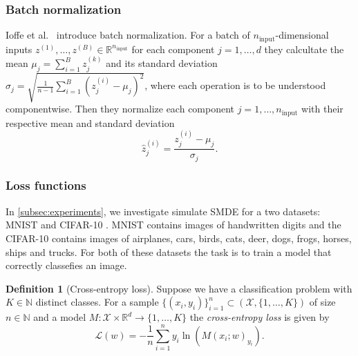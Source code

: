 \documentclass[12pt]{article}
\theoremstyle{definition}
\newtheorem{definition}[definition]{Definition}
\numberwithin{equation}{section}
\newcommand{\N}{\mathbb{N}}
\newcommand{\R}{\mathbb{R}}
\newcommand{\CL}{\mathcal{L}}
\begin{document}
\subsubsection{Batch normalization}
Ioffe et al.\ \cite{ioffeBatchNormalizationAccelerating2015} introduce batch normalization. For a batch of $n_{\text{input}}$-dimensional inputs $z^{(1)},\dots,z^{(B)} \in \R^{n_{\text{input}}}$ for each component $j = 1,\dots, d$ they calcultate the mean $\mu_j = \sum_{i=1}^Bz_j^{(k)}$ and its standard deviation $\sigma_j = \sqrt{\frac{1}{n-1}\sum_{i=1}^B (z_j^{(i)} - \mu_j)^2}$, where each operation is to be understood componentwise. Then they normalize each component $j=1,\dots,n_{\text{input}}$ with their respective mean and standard deviation
\begin{equation*}
  \widehat{z}^{(i)}_j = \frac{z^{(i)}_j - \mu_j}{\sigma_j}.
\end{equation*}
\subsubsection{Loss functions}
In \autoref{subsec:experiments}, we investigate simulate SMDE for a two datasets: MNIST \cite{dengMNISTDatabaseHandwritten2012} and CIFAR-10 \cite{krizhevskyLearningMultipleLayers2009}. MNIST contains images of handwritten digits and the CIFAR-10 contains images of airplanes, cars, birds, cats, deer, dogs, frogs, horses, ships and trucks. For both of these datasets the task is to train a model that correctly classefies an image. 
\begin{definition}[Cross-entropy loss]
  Suppose we have a classification problem with $K \in \N$ distinct classes. For a sample $\{(x_i,y_i)\}_{i=1}^n \subset (\mathcal{X}, \{1,\dots, K\})$ of size $n\in\N$ and a model $M:\mathcal{X} \times \R^d \rightarrow \{1,\dots,K\}$ the \emph{cross-entropy loss} is given by
  \begin{equation*}
    \CL(w) = -\frac{1}{n}\sum_{i=1}^n y_i \ln(M(x_i;w)_{y_i}).
  \end{equation*}  
\end{definition}
\end{document}
